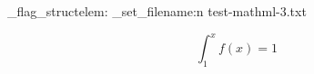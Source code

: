 \documentclass{article}
\begin{document}
\ExplSyntaxOn
\luamml_flag_structelem:  
\luamml_set_filename:n {test-mathml-3.txt} 
\ExplSyntaxOff

$$\int_1^x f(x) = 1 $$ 
\end{document}
